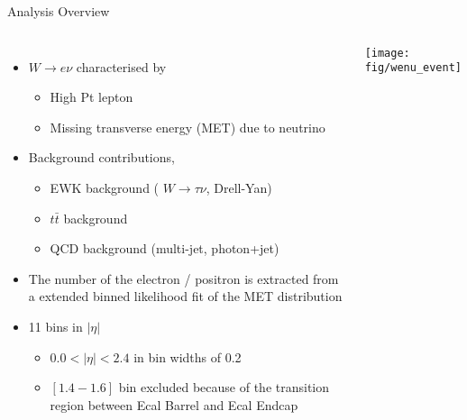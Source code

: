 \documentclass[t, 8pt]{beamer}
\begin{document}
\begin{frame}{Analysis Overview}
  \begin{columns}[c]
  \begin{itemize}
    \item $W \to e\nu$ characterised by 
    \begin{itemize}
      \item High Pt lepton 
      \item Missing transverse energy (MET) due to neutrino
    \end{itemize}
    \item Background contributions,
    \begin{itemize}
      \item EWK background ( $W \to \tau\nu$, Drell-Yan)
      \item $t\bar{t}$ background
      \item QCD background (multi-jet, photon+jet)
    \end{itemize}
    \item The number of the electron / positron is extracted from a extended binned likelihood fit of the MET distribution
    \item 11 bins in $|\eta|$
    \begin{itemize}
      \item $0.0 < |\eta| < 2.4$ in bin widths of 0.2
      \item $[1.4-1.6]$ bin excluded because of the transition region between Ecal Barrel and Ecal Endcap
    \end{itemize}
  \end{itemize}
    \texttt{[image: fig/wenu\_event]}
  \end{columns}
\end{frame}
\end{document}

